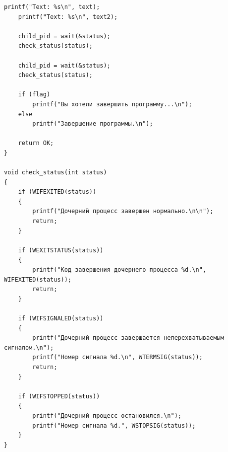 \begin{lstlisting}[label=some-code,caption=Программа 5.]
	printf("Text: %s\n", text);
	printf("Text: %s\n", text2);

	child_pid = wait(&status);
	check_status(status);

	child_pid = wait(&status);
	check_status(status);

	if (flag)
		printf("Вы хотели завершить программу...\n");
	else
		printf("Завершение программы.\n");

	return OK;
}

void check_status(int status)
{
	if (WIFEXITED(status))
	{
		printf("Дочерний процесс завершен нормально.\n\n");
		return;
	}

	if (WEXITSTATUS(status))
	{
		printf("Код завершения дочернего процесса %d.\n", WIFEXITED(status));
		return;
	}

	if (WIFSIGNALED(status))
	{
		printf("Дочерний процесс завершается неперехватываемым сигналом.\n");
		printf("Номер сигнала %d.\n", WTERMSIG(status));
		return;
	}

	if (WIFSTOPPED(status))
	{
		printf("Дочерний процесс остановился.\n");
		printf("Номер сигнала %d.", WSTOPSIG(status));
	}
}
\end{lstlisting}


\begin{figure}[ht!]
\end{figure}
